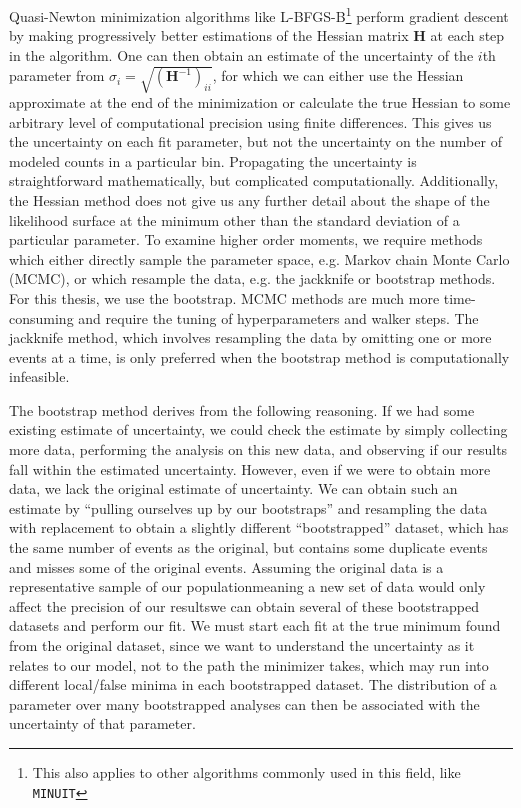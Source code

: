 Quasi-Newton minimization algorithms like L-BFGS-B\footnote{This also applies to other algorithms commonly used in this field, like \texttt{MINUIT}} perform gradient descent by making progressively better estimations of the Hessian matrix $\mathbf{H}$ at each step in the algorithm. One can then obtain an estimate of the uncertainty of the $i$th parameter from $\sigma_i = \sqrt{(\mathbf{H}^{-1})_{ii}}$, for which we can either use the Hessian approximate at the end of the minimization or calculate the true Hessian to some arbitrary level of computational precision using finite differences. This gives us the uncertainty on each fit parameter, but not the uncertainty on the number of modeled counts in a particular bin. Propagating the uncertainty is straightforward mathematically, but complicated computationally. Additionally, the Hessian method does not give us any further detail about the shape of the likelihood surface at the minimum other than the standard deviation of a particular parameter. To examine higher order moments, we require methods which either directly sample the parameter space, e.g. Markov chain Monte Carlo (MCMC), or which resample the data, e.g. the jackknife or bootstrap methods. For this thesis, we use the bootstrap. MCMC methods are much more time-consuming and require the tuning of hyperparameters and walker steps. The jackknife method, which involves resampling the data by omitting one or more events at a time, is only preferred when the bootstrap method is computationally infeasible.

The bootstrap method derives from the following reasoning. If we had some existing estimate of uncertainty, we could check the estimate by simply collecting more data, performing the analysis on this new data, and observing if our results fall within the estimated uncertainty. However, even if we were to obtain more data, we lack the original estimate of uncertainty. We can obtain such an estimate by ``pulling ourselves up by our bootstraps'' and resampling the data with replacement to obtain a slightly different ``bootstrapped'' dataset, which has the same number of events as the original, but contains some duplicate events and misses some of the original events. Assuming the original data is a representative sample of our population\textemdash meaning a new set of data would only affect the precision of our results\textemdash we can obtain several of these bootstrapped datasets and perform our fit. We must start each fit at the true minimum found from the original dataset, since we want to understand the uncertainty as it relates to our model, not to the path the minimizer takes, which may run into different local/false minima in each bootstrapped dataset. The distribution of a parameter over many bootstrapped analyses can then be associated with the uncertainty of that parameter.


